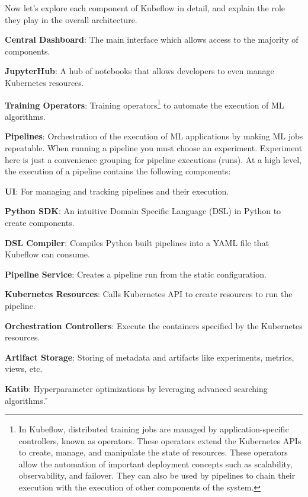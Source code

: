 Now let's explore each component of Kubeflow in detail, and explain the role they play in the overall architecture.

\bit
\item \textbf{Central Dashboard}: The main interface which allows access to the majority of components.
\item \textbf{JupyterHub}: A hub of notebooks that allows developers to even manage Kubernetes resources.
\item \textbf{Training Operators}: Training operators\footnote{In Kubeflow, distributed training jobs are managed by
application-specific controllers, known as operators. These operators extend the Kubernetes APIs to create, manage,
and manipulate the state of resources. These operators allow the automation of important deployment concepts such as
scalability, observability, and failover. They can also be used by pipelines to chain their execution with the
execution of other components of the system.} to automate the execution of ML algorithms.
\item \textbf{Pipelines}: Orchestration of the execution of ML applications by making ML jobs repeatable. \v

When running a pipeline you must choose an experiment. Experiment here is just a convenience grouping for pipeline
executions (runs). At a high level, the execution of a pipeline contains the following components:
\bit
\item \textbf{UI}: For managing and tracking pipelines and their execution.
\item \textbf{Python SDK}: An intuitive Domain Specific Language (DSL) in Python to create components.
\item \textbf{DSL Compiler}: Compiles Python built pipelines into a YAML file that Kubeflow can consume.
\item \textbf{Pipeline Service}: Creates a pipeline run from the static configuration.
\item \textbf{Kubernetes Resources}: Calls Kubernetes API to create resources to run the pipeline.
\item \textbf{Orchestration Controllers}: Execute the containers specified by the Kubernetes resources.
\item \textbf{Artifact Storage}: Storing of metadata and artifacts like experiments, metrics, views, etc.
\eit
\item \textbf{Katib}: Hyperparameter optimizations by leveraging advanced searching algorithms. \v

